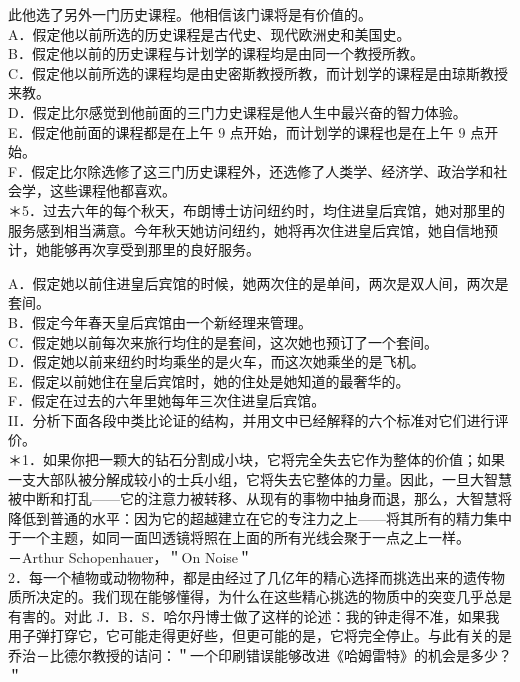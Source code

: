 此他选了另外一门历史课程。他相信该门课将是有价值的。\\
A．假定他以前所选的历史课程是古代史、现代欧洲史和美国史。\\
B．假定他以前的历史课程与计划学的课程均是由同一个教授所教。\\
C．假定他以前所选的课程均是由史密斯教授所教，而计划学的课程是由琼斯教授来教。\\
D．假定比尔感觉到他前面的三门力史课程是他人生中最兴奋的智力体验。\\
E．假定他前面的课程都是在上午 9 点开始，而计划学的课程也是在上午 9 点开始。\\
F．假定比尔除选修了这三门历史课程外，还选修了人类学、经济学、政治学和社会学，这些课程他都喜欢。\\
＊5．过去六年的每个秋天，布朗博士访问纽约时，均住进皇后宾馆，她对那里的服务感到相当满意。今年秋天她访问纽约，她将再次住进皇后宾馆，她自信地预计，她能够再次享受到那里的良好服务。

A．假定她以前住进皇后宾馆的时候，她两次住的是单间，两次是双人间，两次是套间。\\
B．假定今年春天皇后宾馆由一个新经理来管理。\\
C．假定她以前每次来旅行均住的是套间，这次她也预订了一个套间。\\
D．假定她以前来纽约时均乘坐的是火车，而这次她乘坐的是飞机。\\
E．假定以前她住在皇后宾馆时，她的住处是她知道的最奢华的。\\
F．假定在过去的六年里她每年三次住进皇后宾馆。\\
II．分析下面各段中类比论证的结构，并用文中已经解释的六个标准对它们进行评价。\\
＊1．如果你把一颗大的钻石分割成小块，它将完全失去它作为整体的价值；如果一支大部队被分解成较小的士兵小组，它将失去它整体的力量。因此，一旦大智慧被中断和打乱——它的注意力被转移、从现有的事物中抽身而退，那么，大智慧将降低到普通的水平：因为它的超越建立在它的专注力之上——将其所有的精力集中于一个主题，如同一面凹透镜将照在上面的所有光线会聚于一点之上一样。\\
－Arthur Schopenhauer，＂On Noise＂\\
2．每一个植物或动物物种，都是由经过了几亿年的精心选择而挑选出来的遗传物质所决定的。我们现在能够懂得，为什么在这些精心挑选的物质中的突变几乎总是有害的。对此 J．B．S．哈尔丹博士做了这样的论述：我的钟走得不准，如果我用子弹打穿它，它可能走得更好些，但更可能的是，它将完全停止。与此有关的是乔治－比德尔教授的诘问：＂一个印刷错误能够改进《哈姆雷特》的机会是多少？＂

